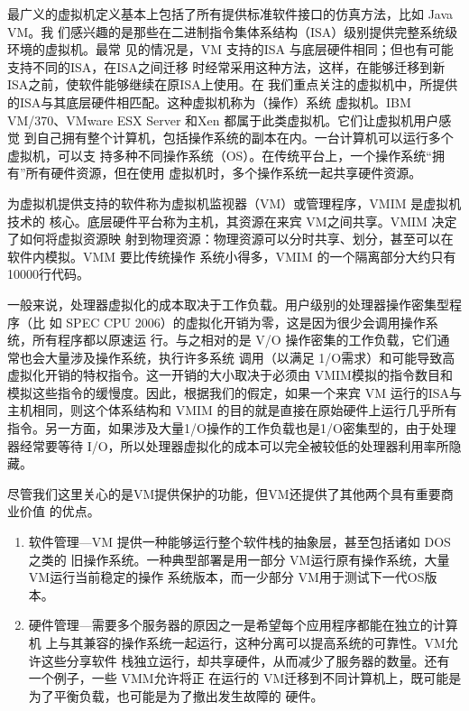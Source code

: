 最广义的虚拟机定义基本上包括了所有提供标准软件接口的仿真方法，比如 Java VM。我
们感兴趣的是那些在二进制指令集体系结构（ISA）级别提供完整系统级环境的虚拟机。最常
见的情况是，VM 支持的ISA 与底层硬件相同；但也有可能支持不同的ISA，在ISA之间迁移
时经常采用这种方法，这样，在能够迁移到新ISA之前，使软件能够继续在原ISA上使用。在
我们重点关注的虚拟机中，所提供的ISA与其底层硬件相匹配。这种虚拟机称为（操作）系统
虚拟机。IBM VM/370、VMware ESX Server 和Xen 都属于此类虚拟机。它们让虚拟机用户感觉
到自己拥有整个计算机，包括操作系统的副本在内。一台计算机可以运行多个虚拟机，可以支
持多种不同操作系统（OS）。在传统平台上，一个操作系统“拥有”所有硬件资源，但在使用
虚拟机时，多个操作系统一起共享硬件资源。

为虚拟机提供支持的软件称为虚拟机监视器（VM）或管理程序，VMIM 是虚拟机技术的
核心。底层硬件平台称为主机，其资源在来宾 VM之间共享。VMIM 决定了如何将虚拟资源映
射到物理资源：物理资源可以分时共享、划分，甚至可以在软件内模拟。VMM 要比传统操作
系统小得多，VMIM 的一个隔离部分大约只有10000行代码。

一般来说，处理器虚拟化的成本取决于工作负载。用户级别的处理器操作密集型程序（比
如 SPEC CPU 2006）的虚拟化开销为零，这是因为很少会调用操作系统，所有程序都以原速运
行。与之相对的是 V/O 操作密集的工作负载，它们通常也会大量涉及操作系统，执行许多系统
调用（以满足 1/O需求）和可能导致高虚拟化开销的特权指令。这一开销的大小取决于必须由
VMIM模拟的指令数目和模拟这些指令的缓慢度。因此，根据我们的假定，如果一个来宾 VM
运行的ISA与主机相同，则这个体系结构和 VMIM 的目的就是直接在原始硬件上运行几乎所有
指令。另一方面，如果涉及大量1/O操作的工作负载也是1/O密集型的，由于处理器经常要等待
I/O，所以处理器虚拟化的成本可以完全被较低的处理器利用率所隐藏。

尽管我们这里关心的是VM提供保护的功能，但VM还提供了其他两个具有重要商业价值
的优点。

\begin{enumerate}
    \item 软件管理—VM 提供一种能够运行整个软件栈的抽象层，甚至包括诸如 DOS之类的
    旧操作系统。一种典型部署是用一部分 VM运行原有操作系统，大量VM运行当前稳定的操作
    系统版本，而一少部分 VM用于测试下一代OS版本。
    \item 硬件管理—需要多个服务器的原因之一是希望每个应用程序都能在独立的计算机
    上与其兼容的操作系统一起运行，这种分离可以提高系统的可靠性。VM允许这些分享软件
    栈独立运行，却共享硬件，从而减少了服务器的数量。还有一个例子，一些 VMM允许将正
    在运行的 VM迁移到不同计算机上，既可能是为了平衡负载，也可能是为了撤出发生故障的
    硬件。
\end{enumerate}


